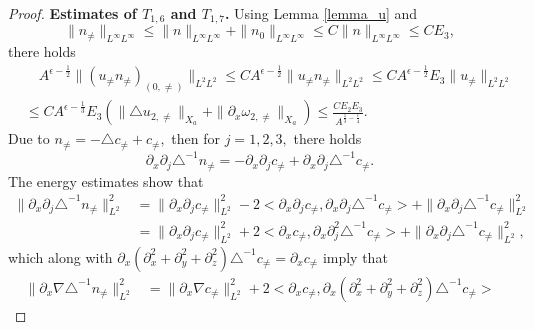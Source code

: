 \documentclass[12pt, reqno]{amsart}
\numberwithin{equation}{section}
\begin{document}
\begin{proof}
		{\bf Estimates of $T_{1,6}$ and $T_{1,7}$.}
		Using Lemma \ref{lemma_u} and 
		\begin{equation}\label{n_infty}
			\|n_{\neq}\|_{L^{\infty}L^{\infty}}\leq 
			\|n\|_{L^{\infty}L^{\infty}}+\|n_0\|_{L^{\infty}L^{\infty}}
			\leq
			C\|n\|_{L^{\infty}L^{\infty}}\leq CE_3,
		\end{equation}
		there holds
		\begin{equation}\label{n0_sub1}
			\begin{aligned}
				&\quad A^{\epsilon-\frac{1}{2}}\|(u_{\neq} n_{\neq})_{(0,\neq)}\|_{L^2L^2}
				\leq CA^{\epsilon-\frac{1}{2}}\|u_{\neq} n_{\neq}\|_{L^2L^2}
				\leq CA^{\epsilon-\frac{1}{2}}
				E_3
				\|u_{\neq}\|_{L^2L^2}\\
				&\leq CA^{\epsilon-\frac{1}{3}}E_3(\| \triangle u_{2,\neq}\|_{X_a}
				+\| \partial_x \omega_{2,\neq}\|_{X_a})
				\leq 
				\frac{CE_2E_3}{ A^{\frac13-\frac{\epsilon}{4}}}.
			\end{aligned}
		\end{equation}
		Due to $n_{\neq}=-\triangle c_{\neq}+c_{\neq},$ then for $j=1,2,3,$ there holds
		\begin{equation*}
			\partial_x\partial_j\triangle^{-1}n_{\neq}
			=-\partial_x\partial_j c_{\neq}
			+\partial_x\partial_j\triangle^{-1}c_{\neq}.
		\end{equation*}
		The energy estimates show that 
		\begin{equation*}
			\begin{aligned}
				\|\partial_x\partial_j\triangle^{-1}n_{\neq}\|_{L^2}^2
				&=\|\partial_x\partial_jc_{\neq}\|_{L^2}^2
				-2<\partial_x\partial_j c_{\neq}
				,\partial_x\partial_j\triangle^{-1}c_{\neq}>
				+\|\partial_x\partial_j\triangle^{-1}c_{\neq}\|_{L^2}^2\\
				&=\|\partial_x\partial_jc_{\neq}\|_{L^2}^2
				+2<\partial_x c_{\neq}
				,\partial_x\partial_j^2\triangle^{-1}c_{\neq}>
				+\|\partial_x\partial_j\triangle^{-1}c_{\neq}\|_{L^2}^2,		
			\end{aligned}
		\end{equation*}
		which along with $\partial_x(\partial_x^2+\partial_y^2+\partial_z^2)
		\triangle^{-1}c_{\neq}=\partial_x c_{\neq}$ imply that 
		\begin{equation}\label{n_neq_11}
			\begin{aligned}
				\|\partial_x\nabla\triangle^{-1}n_{\neq}\|_{L^2}^2
				&=\|\partial_x\nabla c_{\neq}\|_{L^2}^2
				+2<\partial_x c_{\neq}
				,\partial_x(\partial_x^2+\partial_y^2+\partial_z^2)
				\triangle^{-1}c_{\neq}>

\end{aligned}
\end{equation}
\end{proof}
\end{document}
